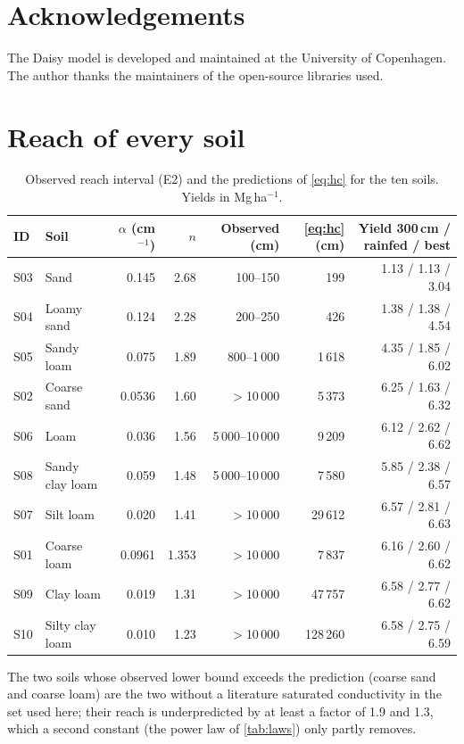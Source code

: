 \documentclass[review,12pt,authoryear]{elsarticle}
\begin{document}
\section*{Acknowledgements}
The Daisy model is developed and maintained at the University of Copenhagen. The author thanks the maintainers of the open-source libraries used.

\appendix
\section{Reach of every soil}\label{app:reach}
\begin{table}[!htbp]\centering\small
\caption{Observed reach interval (E2) and the predictions of \cref{eq:hc} for the ten soils. Yields in Mg\,ha$^{-1}$.}\label{tab:reachall}
\footnotesize\setlength{\tabcolsep}{4pt}
\begin{tabular}{@{}llrrrrr@{}}
\toprule
ID & Soil & $\alpha$ (cm$^{-1}$) & $n$ & Observed (cm) & \cref{eq:hc} (cm) & Yield 300\,cm / rainfed / best\\\midrule
S03 & Sand & 0.145 & 2.68 & 100--150 & 199 & 1.13 / 1.13 / 3.04\\
S04 & Loamy sand & 0.124 & 2.28 & 200--250 & 426 & 1.38 / 1.38 / 4.54\\
S05 & Sandy loam & 0.075 & 1.89 & 800--1\,000 & 1\,618 & 4.35 / 1.85 / 6.02\\
S02 & Coarse sand & 0.0536 & 1.60 & $>$10\,000 & 5\,373 & 6.25 / 1.63 / 6.32\\
S06 & Loam & 0.036 & 1.56 & 5\,000--10\,000 & 9\,209 & 6.12 / 2.62 / 6.62\\
S08 & Sandy clay loam & 0.059 & 1.48 & 5\,000--10\,000 & 7\,580 & 5.85 / 2.38 / 6.57\\
S07 & Silt loam & 0.020 & 1.41 & $>$10\,000 & 29\,612 & 6.57 / 2.81 / 6.63\\
S01 & Coarse loam & 0.0961 & 1.353 & $>$10\,000 & 7\,837 & 6.16 / 2.60 / 6.62\\
S09 & Clay loam & 0.019 & 1.31 & $>$10\,000 & 47\,757 & 6.58 / 2.77 / 6.62\\
S10 & Silty clay loam & 0.010 & 1.23 & $>$10\,000 & 128\,260 & 6.58 / 2.75 / 6.59\\\bottomrule
\end{tabular}
\end{table}
The two soils whose observed lower bound exceeds the prediction (coarse sand and coarse loam) are the two without a literature saturated conductivity in the set used here; their reach is underpredicted by at least a factor of 1.9 and 1.3, which a second constant (the power law of \cref{tab:laws}) only partly removes.
\end{document}

